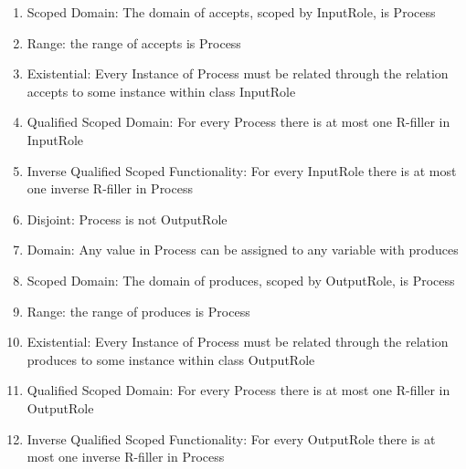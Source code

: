\begin{enumerate}
    \item Scoped Domain: The domain of \textsf{accepts}, scoped by \textsf{InputRole}, is \textsf{Process} %
    \item Range: the range of \textsf{accepts} is \textsf{Process} %
    \item Existential: Every Instance of \textsf{Process} must be related through the relation \textsf{accepts} to some instance within class \textsf{InputRole} %
    \item Qualified Scoped Domain: For every \textsf{Process} there is at most one R-filler in \textsf{InputRole} %
    \item Inverse Qualified Scoped Functionality: For every \textsf{InputRole} there is at most one inverse R-filler in \textsf{Process} %
    \item Disjoint: \textsf{Process} is not \textsf{OutputRole}  %
    \item Domain: Any value in \textsf{Process} can be assigned to any variable with \textsf{produces} %
    \item Scoped Domain: The domain of \textsf{produces}, scoped by \textsf{OutputRole}, is \textsf{Process} %
    \item Range: the range of \textsf{produces} is \textsf{Process} %
    \item Existential: Every Instance of \textsf{Process} must be related through the relation \textsf{produces} to some instance within class \textsf{OutputRole} %
    \item Qualified Scoped Domain: For every \textsf{Process} there is at most one R-filler in \textsf{OutputRole} %
    \item Inverse Qualified Scoped Functionality: For every \textsf{OutputRole} there is at most one inverse R-filler in \textsf{Process} %
\end{enumerate}

